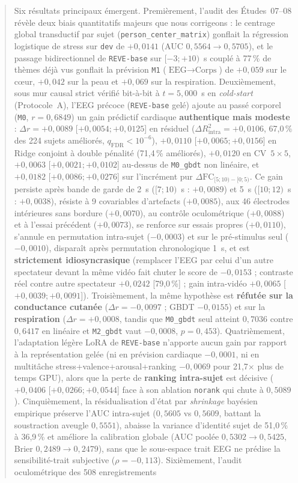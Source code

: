 \documentclass[10pt]{article}
\begin{document}
\begin{abstract}
Six résultats principaux émergent. Premièrement, l'audit des Études~07--08 révèle deux biais quantitatifs majeurs que nous corrigeons : le centrage global transductif par sujet (\texttt{person\_center\_matrix}) gonflait la régression logistique de stress sur \texttt{dev} de $+0{,}0141$ (AUC $0{,}5564 \to 0{,}5705$), et le passage bidirectionnel de \texttt{REVE-base} sur $[-3 ; +10)$~s couplé à 77\,\% de thèmes déjà vus gonflait la prévision \texttt{M1} ($\text{EEG}\to\text{Corps}$) de $+0{,}059$ sur le cœur, $+0{,}042$ sur la peau et $+0{,}069$ sur la respiration. Deuxièmement, sous mur causal strict vérifié bit-à-bit à $t = 5{,}000$~s en \emph{cold-start} (Protocole~A), l'EEG précoce (\texttt{REVE-base} gelé) ajoute au passé corporel (\texttt{M0}, $r = 0{,}6849$) un gain prédictif cardiaque \textbf{authentique mais modeste} : $\Delta r = +0{,}0089$ [$+0{,}0054 ; +0{,}0125$] en résiduel ($\Delta R^2_{\text{intra}} = +0{,}0106$, 67,0\,\% des 224 sujets améliorés, $q_{\text{FDR}} < 10^{-6}$), $+0{,}0110$ [$+0{,}0065 ; +0{,}0156$] en Ridge conjoint à double pénalité (71,4\,\% améliorés), $+0{,}0120$ en CV~$5\times 5$, $+0{,}0063$ [$+0{,}0021 ; +0{,}0102$] au-dessus de \texttt{M0\_gbdt} non linéaire, et $+0{,}0182$ [$+0{,}0086 ; +0{,}0276$] sur l'incrément pur $\Delta\mathrm{FC}_{[5;10)-[0;5)}$. Ce gain persiste après bande de garde de 2~s ($[7 ; 10)$~s : $+0{,}0089$) et 5~s ($[10 ; 12)$~s : $+0{,}0038$), résiste à 9 covariables d'artefacts ($+0{,}0085$), aux 46 électrodes intérieures sans bordure ($+0{,}0070$), au contrôle oculométrique ($+0{,}0088$) et à l'essai précédent ($+0{,}0073$), se renforce sur essais propres ($+0{,}0110$), s'annule en permutation intra-sujet ($-0{,}0003$) et sur le pré-stimulus seul ($-0{,}0010$), disparaît après permutation chronologique 1~s, et est \textbf{strictement idiosyncrasique} (remplacer l'EEG par celui d'un autre spectateur devant la même vidéo fait chuter le score de $-0{,}0153$ ; contraste réel contre autre spectateur $+0{,}0242$ [79,0\,\%] ; gain intra-vidéo $+0{,}0065$ [$+0{,}0039 ; +0{,}0091$]). Troisièmement, la même hypothèse est \textbf{réfutée sur la conductance cutanée} ($\Delta r = -0{,}0097$ ; GBDT $-0{,}0155$) et sur la \textbf{respiration} ($\Delta r = +0{,}0008$, tandis que \texttt{M0\_gbdt} seul atteint $0{,}7036$ contre $0{,}6417$ en linéaire et \texttt{M2\_gbdt} vaut $-0{,}0008$, $p = 0{,}453$). Quatrièmement, l'adaptation légère LoRA de \texttt{REVE-base} n'apporte aucun gain par rapport à la représentation gelée (ni en prévision cardiaque $-0{,}0001$, ni en multitâche stress+valence+arousal+ranking $-0{,}0069$ pour 21,7$\times$ plus de temps GPU), alors que la perte de \textbf{ranking intra-sujet} est décisive ($+0{,}0406$ [$+0{,}0266 ; +0{,}0544$] face à son ablation \texttt{norank} qui chute à $0{,}5089$). Cinquièmement, la résidualisation d'état par \emph{shrinkage} bayésien empirique préserve l'AUC intra-sujet ($0{,}5605$ vs $0{,}5609$, battant la soustraction aveugle $0{,}5551$), abaisse la variance d'identité sujet de 51,0\,\% à 36,9\,\% et améliore la calibration globale (AUC poolée $0{,}5302 \to 0{,}5425$, Brier $0{,}2489 \to 0{,}2479$), sans que le sous-espace trait EEG ne prédise la sensibilité-trait subjective ($\rho = -0{,}113$). Sixièmement, l'audit oculométrique des 508 enregistrements 
\end{abstract}
\end{document}
